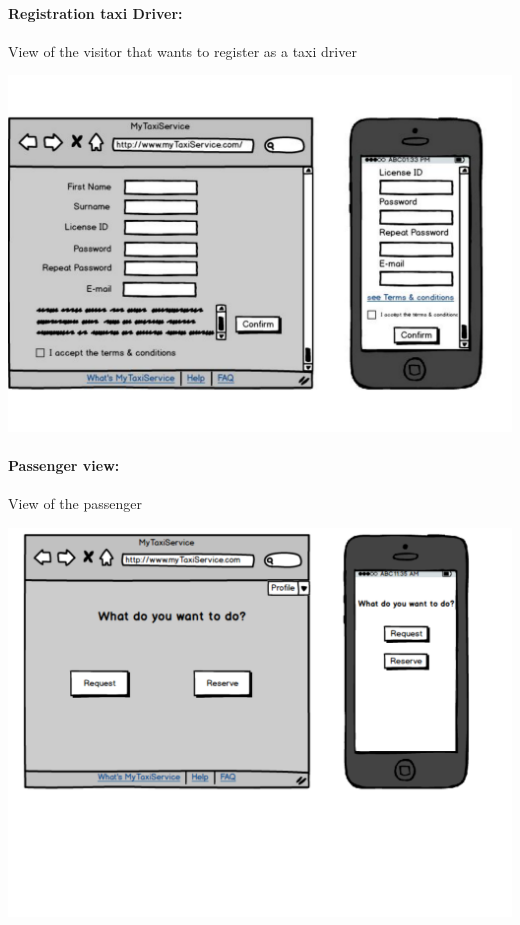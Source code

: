 \paragraph{Registration taxi Driver:}
	View of the visitor that wants to register as a taxi driver
\begin{center}
	\includegraphics[width=\textwidth]{mockup/registrationTaxiDriver.pdf}
\end{center}
\newpage
\paragraph{Passenger view:}
View of the passenger
\begin{center}
	\includegraphics[width=\textwidth]{mockup/passengerFunctions.pdf}
\end{center}
\newpage
